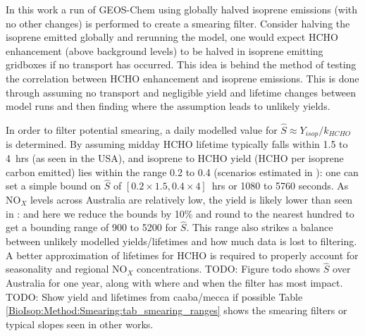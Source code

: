     In this work a run of GEOS-Chem using globally halved isoprene emissions (with no other changes) is performed to create a smearing filter.
    Consider halving the isoprene emitted globally and rerunning the model, one would expect HCHO enhancement (above background levels) to be halved in isoprene emitting gridboxes if no transport has occurred.
    This idea is behind the method of testing the correlation between HCHO enhancement and isoprene emissions.
    This is done through assuming no transport and negligible yield and lifetime changes between model runs and then finding where the assumption leads to unlikely yields.
    
    In order to filter potential smearing, a daily modelled value for $\hat{S} \approx Y_{isop}/k_{HCHO}$ is determined.
    By assuming midday HCHO lifetime typically falls within 1.5 to 4~hrs (as seen in the USA), and isoprene to HCHO yield (HCHO per isoprene carbon emitted) lies within the range 0.2 to 0.4 (scenarios estimated in \textcite{Palmer2003}): one can set a simple bound on $\hat{S}$ of $[0.2 \times 1.5, 0.4 \times 4]$~hrs or 1080 to 5760 seconds.
    As NO$_X$ levels across Australia are relatively low, the yield is likely lower than seen in \textcite{Palmer2003}: and here we reduce the bounds by 10\% and round to the nearest hundred to get a bounding range of 900 to 5200 for $\hat{S}$. 
    This range also strikes a balance between unlikely modelled yields/lifetimes and how much data is lost to filtering.
    A better approximation of lifetimes for HCHO is required to properly account for seasonality and regional NO$_X$ concentrations.
    TODO: Figure todo shows $\hat{S}$ over Australia for one year, along with where and when the filter has most impact.
    TODO: Show yield and lifetimes from caaba/mecca if possible
    Table \ref{BioIsop:Method:Smearing:tab_smearing_ranges} shows the smearing filters or typical slopes seen in other works.
    
